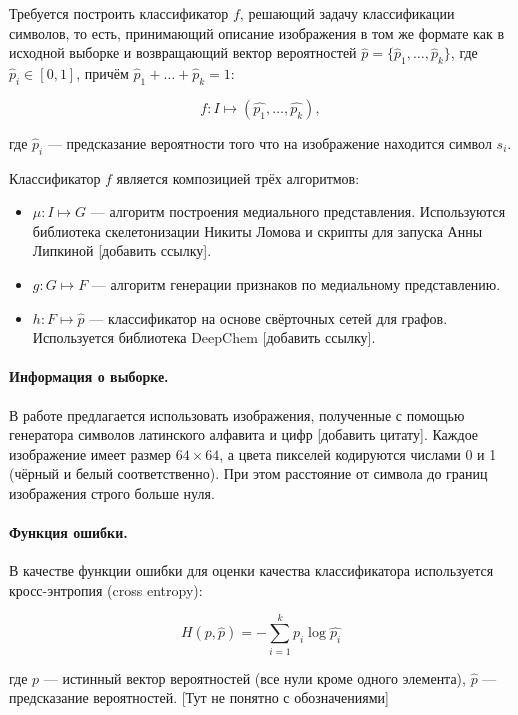 \documentclass[12pt,twoside]{article}
\begin{document}
Требуется построить классификатор $f$, решающий задачу классификации символов, то есть, принимающий описание изображения в том же формате как в исходной выборке и возвращающий вектор вероятностей $\hat{p}=\{\hat{p}_1,\ldots,\hat{p}_k\}$, где $\hat{p}_i \in [0, 1]$, причём $\hat{p}_1+\ldots+\hat{p}_k=1$:

$$f: I \mapsto (\hat{p_1},\ldots,\hat{p_k}),$$

где $\hat{p}_i$ --- предсказание вероятности того что на изображение находится символ $s_i$.

Классификатор $f$ является композицией трёх алгоритмов:
\begin{itemize}
    \item $\mu: I \mapsto G$ --- алгоритм построения медиального представления. Используются библиотека
скелетонизации Никиты Ломова и скрипты для запуска Анны
Липкиной [добавить ссылку]. 
    \item $g: G \mapsto F$ --- алгоритм генерации признаков по медиальному представлению.
    \item $h: F \mapsto \hat{p}$ --- классификатор на основе свёрточных сетей для графов. Используется библиотека DeepChem [добавить ссылку].
\end{itemize}


\paragraph{Информация о выборке.}

В работе предлагается использовать изображения, полученные с помощью генератора символов латинского алфавита и цифр [добавить цитату]. Каждое изображение имеет размер $64\times64$, а цвета пикселей кодируются числами 0 и 1 (чёрный и белый соответственно). При этом расстояние от символа до границ изображения строго больше нуля.


\paragraph{Функция ошибки.}

В качестве функции ошибки для оценки качества классификатора используется кросс-энтропия (cross entropy):

$$H(p, \hat{p}) = -\sum_{i=1}^k p_i\log{\hat{p_i}}$$

где $p$ --- истинный вектор вероятностей (все нули кроме одного элемента), $\hat{p}$ --- предсказание вероятностей.
[Тут не понятно с обозначениями]

\end{document}
